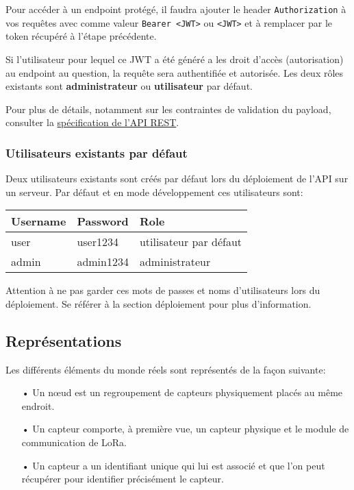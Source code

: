 Pour accéder à un endpoint protégé, il faudra ajouter le header \texttt{Authorization} à vos requêtes avec comme valeur \texttt{Bearer <JWT>} ou \texttt{<JWT>} et à remplacer par le token récupéré à l'étape précédente.

Si l'utilisateur pour lequel ce JWT a été généré a les droit d'accès (autorisation) au endpoint au question, la requête sera authentifiée et autorisée. Les deux rôles existants sont \textbf{administrateur} ou \textbf{utilisateur} par défaut.

Pour plus de détails, notamment sur les contraintes de validation du payload, consulter la \href{https://github.com/heig-vd-iot2018/back-end/blob/master/dev/iot-rest-api/api/swagger/swagger.md}{spécification de l'API REST}.

\subsubsection{Utilisateurs existants par défaut}

Deux utilisateurs existants sont créés par défaut lors du déploiement de l'API sur un serveur. Par défaut et en mode développement ces utilisateurs sont:
\medskip

\renewcommand{\arraystretch}{1.2}
\begin{tabular}{|l|l|l|}
\hline
\textbf{Username} & \textbf{Password} & \textbf{Role} \\
\hline
user & user1234 & utilisateur par défaut \\
admin & admin1234 & administrateur \\
\hline
\end{tabular}
\renewcommand{\arraystretch}{1}
\medskip

Attention à ne pas garder ces mots de passes et noms d'utilisateurs lors du déploiement. Se référer à la section déploiement pour plus d'information.

\subsection{Représentations}

Les différents éléments du monde réels sont représentés de la façon suivante:

\begin{itemize}
\item[•] Un nœud est un regroupement de capteurs physiquement placés au même endroit.
\item[•] Un capteur comporte, à première vue, un capteur physique et le module de communication de LoRa.
\item[•]  Un capteur a un identifiant unique qui lui est associé et que l'on peut récupérer pour identifier précisément le capteur.
\end{itemize}

